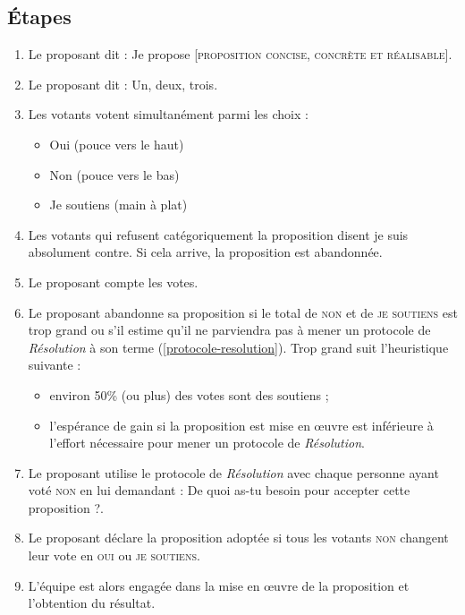 \documentclass[paper=6in:9in,pagesize=pdftex,headinclude=on,footinclude=on,12pt]{scrbook}
\newcommand*{\numref}[1]{{\hyperref[{#1}]{\autoref*{#1}}}}
\begin{document}
\subsection{Étapes}
\begin{enumerate}
	\item Le proposant dit : \og{}Je propose [\textsc{proposition concise, con\-crète et réalisable}]\fg{}.
	\item Le proposant dit : \og{}Un, deux, trois\fg{}.
	\item Les votants votent simultanément parmi les choix :
	      \begin{itemize}
	      	\item Oui (pouce vers le haut)
	      	\item Non (pouce vers le bas)
	      	\item Je soutiens (main à plat)
	      \end{itemize}
	\item Les votants qui refusent catégoriquement la proposition disent \og{}je suis absolument contre\fg{}. Si cela arrive, la proposition est abandonnée.
	\item Le proposant compte les votes.
	\item Le proposant abandonne sa proposition si le total de \textsc{non} et de \textsc{je soutiens} est \og{}trop grand\fg{} ou s'il estime qu'il ne parviendra
	      pas à mener un protocole de \emph{Résolution} à son terme (\numref{protocole-resolution}). \og{}Trop grand\fg{} suit l'heuristique suivante :
	      \begin{itemize}
	      	\item environ 50\% (ou plus) des votes sont des soutiens ;
	      	\item l'espérance de gain si la proposition est mise en œuvre est inférieure à l'effort nécessaire pour mener un protocole de \emph{Résolution}.
	      \end{itemize}
	\item Le proposant utilise le protocole de \emph{Résolution} avec chaque personne ayant voté \textsc{non} en lui demandant : \og{}De quoi as-tu besoin pour
	      accepter cette proposition ?\fg{}.
	\item Le proposant déclare la proposition adoptée si tous les votants \textsc{non} changent leur vote en \textsc{oui} ou \textsc{je soutiens}.
	\item L'équipe est alors engagée dans la mise en œuvre de la proposition et l'obtention du résultat.
\end{enumerate}
\end{document}
